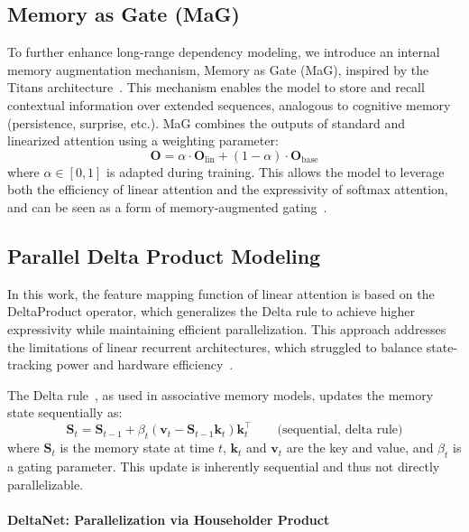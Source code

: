 \documentclass[10pt,a4paper]{article}
\begin{document}
\subsection{Memory as Gate (MaG)}

To further enhance long-range dependency modeling, we introduce an internal memory augmentation mechanism, Memory as Gate (MaG), inspired by the Titans architecture~\cite{behrouz2024titans}. This mechanism enables the model to store and recall contextual information over extended sequences, analogous to cognitive memory (persistence, surprise, etc.). MaG combines the outputs of standard and linearized attention using a weighting parameter:
\begin{equation}
\mathbf{O} = \alpha \cdot \mathbf{O}_{\text{lin}} + (1-\alpha) \cdot \mathbf{O}_{\text{base}}
\end{equation}
where $\alpha \in [0,1]$ is adapted during training. This allows the model to leverage both the efficiency of linear attention and the expressivity of softmax attention, and can be seen as a form of memory-augmented gating~\cite{behrouz2024titans, mercat2024linearizing, munkhdalai2024leave}.

\subsection{Parallel Delta Product Modeling}

In this work, the feature mapping function of linear attention is based on the DeltaProduct operator, which generalizes the Delta rule to achieve higher expressivity while maintaining efficient parallelization. This approach addresses the limitations of linear recurrent architectures, which struggled to balance state-tracking power and hardware efficiency~\cite{siems2025deltaproduct, yang2024parallelizing}.

The Delta rule~\cite{rumelhart1986learning}, as used in associative memory models, updates the memory state sequentially as:
\begin{equation}
    \mathbf{S}_t = \mathbf{S}_{t-1} + \beta_t \left( \mathbf{v}_t - \mathbf{S}_{t-1} \mathbf{k}_t \right) \mathbf{k}_t^\top
    \qquad \text{(sequential, delta rule)}
\end{equation}
where $\mathbf{S}_t$ is the memory state at time $t$, $\mathbf{k}_t$ and $\mathbf{v}_t$ are the key and value, and $\beta_t$ is a gating parameter. This update is inherently sequential and thus not directly parallelizable.

\paragraph{DeltaNet: Parallelization via Householder Product}
\end{document}
